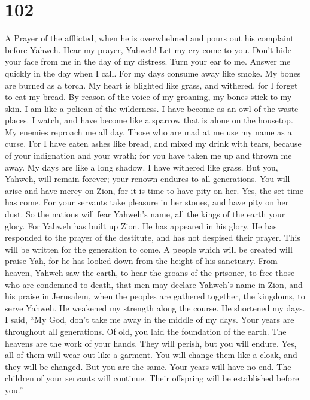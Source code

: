 \hypertarget{section-94}{%
\section{102}\label{section-94}}

A Prayer of the afflicted, when he is overwhelmed and pours out his
complaint before Yahweh.  Hear my prayer, Yahweh! Let my
cry come to you.  Don't hide your face from me in the day
of my distress. Turn your ear to me. Answer me quickly in the day when I
call.  For my days consume away like smoke. My bones are
burned as a torch.  My heart is blighted like grass, and
withered, for I forget to eat my bread.  By reason of the
voice of my groaning, my bones stick to my skin.  I am
like a pelican of the wilderness. I have become as an owl of the waste
places.  I watch, and have become like a sparrow that is
alone on the housetop.  My enemies reproach me all day.
Those who are mad at me use my name as a curse.  For I
have eaten ashes like bread, and mixed my drink with tears,
 because of your indignation and your wrath; for you have
taken me up and thrown me away.  My days are like a long
shadow. I have withered like grass.  But you, Yahweh,
will remain forever; your renown endures to all generations.
 You will arise and have mercy on Zion, for it is time to
have pity on her. Yes, the set time has come.  For your
servants take pleasure in her stones, and have pity on her dust.
 So the nations will fear Yahweh's name, all the kings of
the earth your glory.  For Yahweh has built up Zion. He
has appeared in his glory.  He has responded to the
prayer of the destitute, and has not despised their prayer.
 This will be written for the generation to come. A
people which will be created will praise Yah,  for he has
looked down from the height of his sanctuary. From heaven, Yahweh saw
the earth,  to hear the groans of the prisoner, to free
those who are condemned to death,  that men may declare
Yahweh's name in Zion, and his praise in Jerusalem,  when
the peoples are gathered together, the kingdoms, to serve Yahweh.
 He weakened my strength along the course. He shortened
my days.  I said, ``My God, don't take me away in the
middle of my days. Your years are throughout all generations.
 Of old, you laid the foundation of the earth. The
heavens are the work of your hands.  They will perish,
but you will endure. Yes, all of them will wear out like a garment. You
will change them like a cloak, and they will be changed. 
But you are the same. Your years will have no end.  The
children of your servants will continue. Their offspring will be
established before you.''

